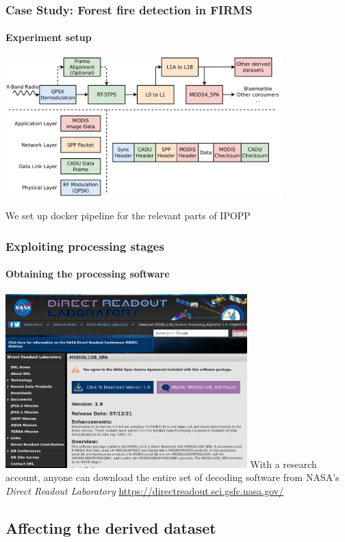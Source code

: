 \documentclass{beamer}
\begin{document}
\begin{frame}
  \frametitle{Case Study: Forest fire detection in FIRMS}
  \framesubtitle{Experiment setup}

  \begin{center}
    \includegraphics[width=0.8\textwidth]{images/attack_types.pdf}
  \end{center}

  We set up docker pipeline for the relevant parts of IPOPP
\end{frame}

\begin{frame}
  \frametitle{Exploiting processing stages}
  \framesubtitle{Obtaining the processing software}
  \centering
  \includegraphics[width=0.7\textwidth]{images/drl.png}
  \newline
  With a research account, anyone can download the entire set of decoding software from NASA's \textit{Direct Readout Laboratory}
  \newline
  \url{https://directreadout.sci.gsfc.nasa.gov/}
\end{frame}

\subsection{Affecting the derived dataset}
\end{document}
